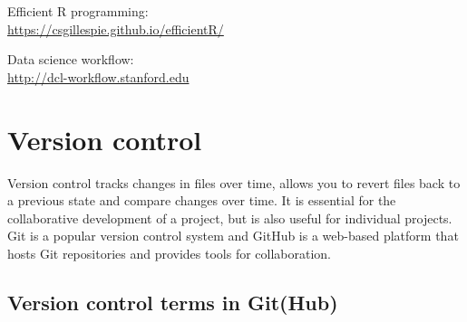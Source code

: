 \documentclass[
  letterpaper,
  DIV=11,
  numbers=noendperiod]{scrreport}
\begin{document}
Efficient R programming:\\
\url{https://csgillespie.github.io/efficientR/}

Data science workflow:\\
\url{http://dcl-workflow.stanford.edu}


\chapter{Version control}\label{sec-git}

Version control tracks changes in files over time, allows you to revert
files back to a previous state and compare changes over time. It is
essential for the collaborative development of a project, but is also
useful for individual projects. Git is a popular version control system
and GitHub is a web-based platform that hosts Git repositories and
provides tools for collaboration.

\section{Version control terms in
Git(Hub)}\label{version-control-terms-in-github}
\end{document}
